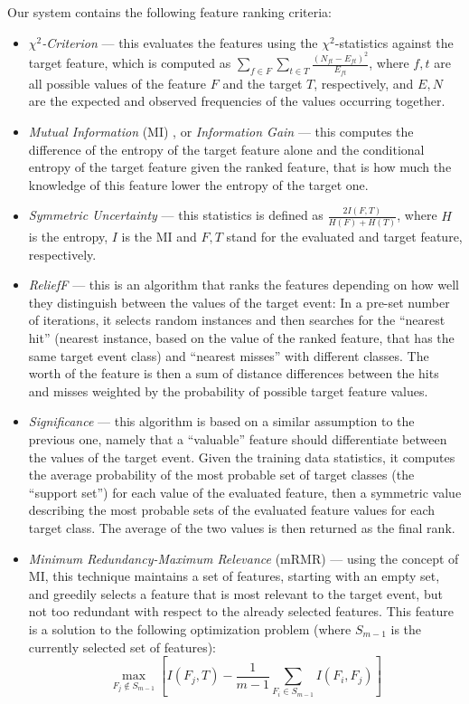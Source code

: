 \documentclass[12pt,notitlepage,a4paper]{report}
\begin{document}
Our system contains the following feature ranking criteria:
\begin{itemize}
    \item \emph{$\chi^2$-Criterion} \citep[p.~255]{manning08} --- this evaluates the features using the $\chi^2$-statistics against the target feature, which is computed as $\sum_{f\in F}\sum_{t\in T}\frac{(N_{ft}-E_{ft})^2}{E_{ft}}$, where $f,t$ are all possible values of the feature $F$ and the target $T$, respectively, and $E,N$ are the expected and observed frequencies of the values occurring together.
    \item \emph{Mutual Information} (MI) \citep[p.~583]{manning00}, or \emph{Information Gain} \citep[p.~264]{manning08} --- this computes the difference of the entropy of the target feature alone and the conditional entropy of the target feature given the ranked feature, that is how much the knowledge of this feature lower the entropy of the target one.
    \item \emph{Symmetric Uncertainty} \citep[p.~291f.]{witten05} --- this statistics is defined as $\frac{2I(F,T)}{H(F) + H(T)}$, where $H$ is the entropy, $I$ is the MI and $F,T$ stand for the evaluated and target feature, respectively.
    \item \emph{ReliefF} \citep{kira92,kononenko94} --- this is an algorithm that ranks the features depending on how well they distinguish between the values of the target event: In a pre-set number of iterations, it selects random instances and then searches for the ``nearest hit'' (nearest instance, based on the value of the ranked feature, that has the same target event class) and ``nearest misses'' with different classes. The worth of the feature is then a sum of distance differences between the hits and misses weighted by the probability of possible target feature values.
    \item \emph{Significance} \citep{ahmad05} --- this algorithm is based on a similar assumption to the previous one, namely that a ``valuable'' feature should differentiate between the values of the target event. Given the training data statistics, it computes the average probability of the most probable set of target classes (the ``support set'') for each value  of the evaluated feature, then a symmetric value describing the most probable sets of the evaluated feature values for each target class. The average of the two values is then returned as the final rank.
    \item \emph{Minimum Redundancy-Maximum Relevance} (mRMR) \citep{peng05} --- using the concept of MI, this technique maintains a set of features, starting with an empty set, and greedily selects a feature that is most relevant to the target event, but not too redundant with respect to the already selected features. This feature is a solution to the following optimization problem (where $S_{m-1}$ is the currently selected set of features):
\begin{equation}
\max_{F_j\not\in S_{m-1}} \left[ I(F_j,T) - \frac{1}{m-1} \sum_{F_i\in S_{m-1}} I(F_i,F_j)\right]
\end{equation}
\end{itemize}
\end{document}
